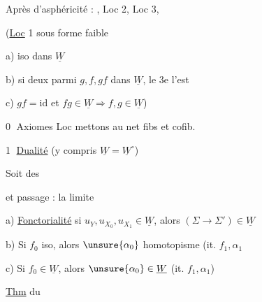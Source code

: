 Après  d'asphéricité :  , Loc 2, Loc 3,

(\uline{Loc} 1 sous forme faible

a) iso dans $\underline W$

b) si deux parmi $g,f,gf$ dans $\underline W$, le 3e l'est

c) $gf=\mathrm{id}$ et $fg\in\underline W\Rightarrow f,g\in\underline W$)

\textcircled{0} Axiomes Loc mettons au net   fibs et cofib.

\textcircled{1} \uline{Dualité} (y compris $\underline W=\underline W^\circ$)


  Soit des


et passage : la limite


a) \uline{Fonctorialité} si $u_Y,u_{X_0},u_{X_1}\in\underline W$, alors $(\Sigma\to\Sigma')\in\underline W$

b) Si $f_0$ iso, alors $\unsure{\alpha_0}$ homotopisme (it. $f_1,\alpha_1$

c) Si $f_0\in\underline W$, alors $\unsure{\alpha_0}\in\underline W$ (it. $f_1,\alpha_1$)

  \uline{Thm} du

